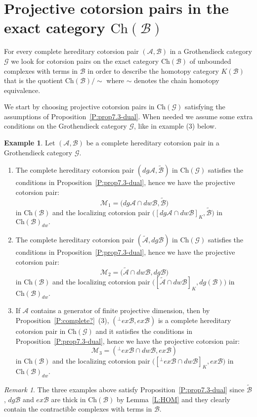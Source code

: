 \documentclass[11pt,a4paper,reqno]{amsart}
\newcommand{\A}{\mathcal{A}}
\newcommand{\B}{\mathcal{B}}
\newcommand{\G}{\mathcal{G}}
\newcommand{\M}{\mathcal{M}}
\newcommand{\Ch}{\mathrm{Ch}}
\theoremstyle{plain}
\theoremstyle{definition}
\newtheorem{expl}[thm]{Example}
\theoremstyle{remark}
\newtheorem{rem}[thm]{Remark}
\begin{document}
%
%
%

\section{Projective cotorsion pairs in the exact category $\Ch(\B)$}\label{S:B}



For every complete hereditary cotorsion pair $(\A, \B)$ in a Grothendieck category $\G$ we look for cotorsion pairs on the exact category $\Ch(\B)$ of unbounded complexes with terms in $\B$ in order to describe the homotopy category $K( \B)$ that is the quotient $\Ch( \B)/\sim$ where $\sim$ denotes the chain homotopy equivalence.

We start by choosing projective cotorsion pairs in $\Ch(\G)$ satisfying the assumptions of Proposition~\ref{P:prop7.3-dual}.
When needed we assume some extra conditions on the Grothendieck category $\G$, like in example (3) below.


\begin{expl}\label{E:examples-proj} Let $(\A, \B)$ be a complete hereditary cotorsion pair in a  Grothendieck category $\G$.
 \begin{enumerate}
%
%
\item The complete hereditary cotorsion pair $(dg \A, \widetilde{\B})$ in $\Ch(\G)$ satisfies the conditions in  Proposition~\ref{P:prop7.3-dual}, hence we have the projective cotorsion pair:
%
 \[\M_1=\Big(dg{\A}\cap dw \B, \widetilde{\B}\Big)\] in $\Ch(\B)$ and the localizing cotorsion pair $\Big([dg{\A}\cap dw \B]_K,  \widetilde{\B}\Big)$ in $\Ch(\B)_{dw}.$
\item The complete hereditary cotorsion pair $(\widetilde{\A}, dg \B)$ in $\Ch(\G)$ satisfies the conditions in  Proposition~\ref{P:prop7.3-dual}, hence we have the projective cotorsion pair:
%
 \[\M_2=\Big(\widetilde{\A}\cap dw \B, dg \B\Big)\] in $\Ch(\B)$ and the localizing cotorsion pair $\Big([\widetilde{\A}\cap dw \B]_K, dg (\B)\Big)$ in $\Ch(\B)_{dw}.$

%
%
%

\item If $\A$ contains a generator of finite projective dimension, then by Proposition~\ref{P:complete?}~(3), $({}^\perp{} ex\B, ex\B)$ is a complete hereditary cotorsion pair in $\Ch(\G)$ and it satisfies the conditions in  Proposition~\ref{P:prop7.3-dual}, hence  we have the projective cotorsion pair:
 \[\M_3=({}^\perp{} ex\B\cap dw \B, ex\B)\] in $\Ch(\B)$ and the localizing cotorsion pair $\Big([{}^\perp{} ex\B\cap dw \B]_K, ex\B\Big)$ in $\Ch(\B)_{dw}.$

 \end{enumerate}
 \end{expl}
 \begin{rem}\label{R:thick-1} The three examples above satisfy Proposition~\ref{P:prop7.3-dual} since $\tilde{\B}$, $dg\B$ and $ex\B$  are thick in $\Ch(\B)$ by Lemma~\ref{L:HOM} and they clearly contain the contractible complexes with terms in $\B$.
 \end{rem}
\end{document}
